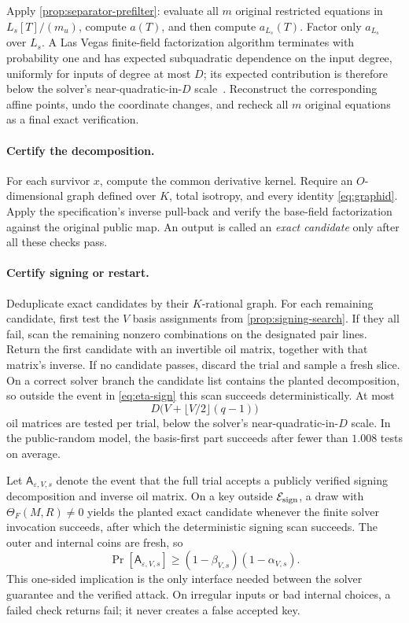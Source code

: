 \documentclass[11pt,a4paper]{article}
\theoremstyle{definition}
\theoremstyle{remark}
\newcommand{\cE}{\mathcal E}
\begin{document}
Apply \cref{prop:separator-prefilter}: evaluate all $m$ original restricted equations in $L_s[T]/(m_u)$, compute $a(T)$, and then compute $a_{L_s}(T)$.  Factor only $a_{L_s}$ over $L_s$.  A Las Vegas finite-field factorization algorithm terminates with probability one and has expected subquadratic dependence on the input degree, uniformly for inputs of degree at most $D$; its expected contribution is therefore below the solver's near-quadratic-in-$D$ scale~\cite{KaltofenShoup}.  Reconstruct the corresponding affine points, undo the coordinate changes, and recheck all $m$ original equations as a final exact verification.

\paragraph{Certify the decomposition.}
For each survivor $x$, compute the common derivative kernel.  Require an $O$-dimensional graph defined over $K$, total isotropy, and every identity \eqref{eq:graphid}.  Apply the specification's inverse pull-back and verify the base-field factorization against the original public map.  An output is called an \emph{exact candidate} only after all these checks pass.

\paragraph{Certify signing or restart.}
Deduplicate exact candidates by their $K$-rational graph.  For each remaining candidate, first test the $V$ basis assignments from \cref{prop:signing-search}.  If they all fail, scan the remaining nonzero combinations on the designated pair lines.  Return the first candidate with an invertible oil matrix, together with that matrix's inverse.  If no candidate passes, discard the trial and sample a fresh slice.  On a correct solver branch the candidate list contains the planted decomposition, so outside the event in \eqref{eq:eta-sign} this scan succeeds deterministically.  At most
\[
 D\bigl(V+\lfloor V/2\rfloor(q-1)\bigr)
\]
oil matrices are tested per trial, below the solver's near-quadratic-in-$D$ scale.  In the public-random model, the basis-first part succeeds after fewer than $1.008$ tests on average.

Let $\mathsf A_{\varepsilon,V,s}$ denote the event that the full trial accepts a publicly verified signing decomposition and inverse oil matrix.  On a key outside $\cE_{\rm sign}$, a draw with $\Theta_F(M,R)\ne0$ yields the planted exact candidate whenever the finite solver invocation succeeds, after which the deterministic signing scan succeeds.  The outer and internal coins are fresh, so
\begin{equation}\label{eq:acceptance-lower-bound}
\Pr[\mathsf A_{\varepsilon,V,s}]
\ge(1-\beta_{V,s})(1-\alpha_{V,s}).
\end{equation}
This one-sided implication is the only interface needed between the solver guarantee and the verified attack.  On irregular inputs or bad internal choices, a failed check returns \textsf{fail}; it never creates a false accepted key.
\end{document}
